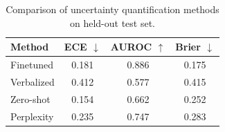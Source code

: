 \begin{table}[t]
\centering
\caption{Comparison of uncertainty quantification methods on held-out test set.}
\label{tab:results}
\begin{tabular}{lccc}
\toprule
\textbf{Method} & \textbf{ECE $\downarrow$} & \textbf{AUROC $\uparrow$} & \textbf{Brier $\downarrow$} \\
\midrule
Finetuned & 0.181 & 0.886 & 0.175 \\
Verbalized & 0.412 & 0.577 & 0.415 \\
Zero-shot & 0.154 & 0.662 & 0.252 \\
Perplexity & 0.235 & 0.747 & 0.283 \\
\bottomrule
\end{tabular}
\end{table}

